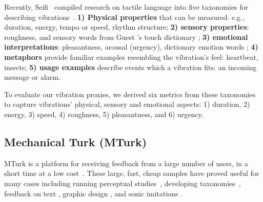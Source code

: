 Recently, Seifi \etal\ compiled research on tactile language into five taxonomies for describing vibrations~\cite{Seifi2015}.  \textbf{1) Physical properties} that can be measured: e.g., duration, energy, tempo or speed, rhythm structure; 
\textbf{2) sensory properties}: roughness, and sensory words from  Guest \etal's touch dictionary \cite{Guest2011};
\textbf{3) emotional interpretations}: pleasantness, arousal (urgency), dictionary emotion words \cite{Guest2011};
\textbf{4) metaphors} provide familiar examples resembling the vibration's feel: heartbeat, insects;
\textbf{5) usage examples} describe %
events which a vibration fits: an incoming message or alarm.

To evaluate our vibration proxies, we derived six metrics from these taxonomies to capture vibrations' physical, sensory and emotional aspects:  
1) duration, 2) energy, 3) speed, 4) roughness, 5) pleasantness, and 6) urgency. 


\subsection{Mechanical Turk (MTurk)}
MTurk is a platform for receiving feedback from a large number of users, in a short time at a low cost~\cite{mutrkgeneral,visualperceptionturk}. These large, fast, cheap samples have proved useful for many cases including running perceptual studies~\cite{visualperceptionturk}, developing taxonomies~\cite{taxonomyturk}, feedback on text \cite{Siangliulue2015}, graphic design \cite{Xu2014}, and sonic imitations \cite{Cartwright2015}.


